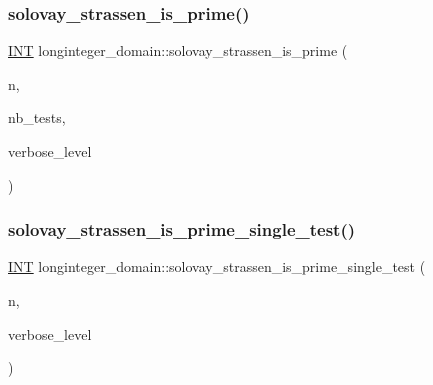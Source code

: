 \mbox{\label{classlonginteger__domain_a8161357a52c022f146b273a73f29edc8}} 
\subsubsection{\texorpdfstring{solovay\+\_\+strassen\+\_\+is\+\_\+prime()}{solovay\_strassen\_is\_prime()}}
{\footnotesize\ttfamily \mbox{\hyperlink{galois_8h_a09fddde158a3a20bd2dcadb609de11dc}{I\+NT}} longinteger\+\_\+domain\+::solovay\+\_\+strassen\+\_\+is\+\_\+prime (\begin{DoxyParamCaption}\item[{\mbox{\hyperlink{classlonginteger__object}{longinteger\+\_\+object}} \&}]{n,  }\item[{\mbox{\hyperlink{galois_8h_a09fddde158a3a20bd2dcadb609de11dc}{I\+NT}}}]{nb\+\_\+tests,  }\item[{\mbox{\hyperlink{galois_8h_a09fddde158a3a20bd2dcadb609de11dc}{I\+NT}}}]{verbose\+\_\+level }\end{DoxyParamCaption})}

\mbox{\label{classlonginteger__domain_a818b8c30812875d45041a6aaaa335589}} 
\subsubsection{\texorpdfstring{solovay\+\_\+strassen\+\_\+is\+\_\+prime\+\_\+single\+\_\+test()}{solovay\_strassen\_is\_prime\_single\_test()}}
{\footnotesize\ttfamily \mbox{\hyperlink{galois_8h_a09fddde158a3a20bd2dcadb609de11dc}{I\+NT}} longinteger\+\_\+domain\+::solovay\+\_\+strassen\+\_\+is\+\_\+prime\+\_\+single\+\_\+test (\begin{DoxyParamCaption}\item[{\mbox{\hyperlink{classlonginteger__object}{longinteger\+\_\+object}} \&}]{n,  }\item[{\mbox{\hyperlink{galois_8h_a09fddde158a3a20bd2dcadb609de11dc}{I\+NT}}}]{verbose\+\_\+level }\end{DoxyParamCaption})}

